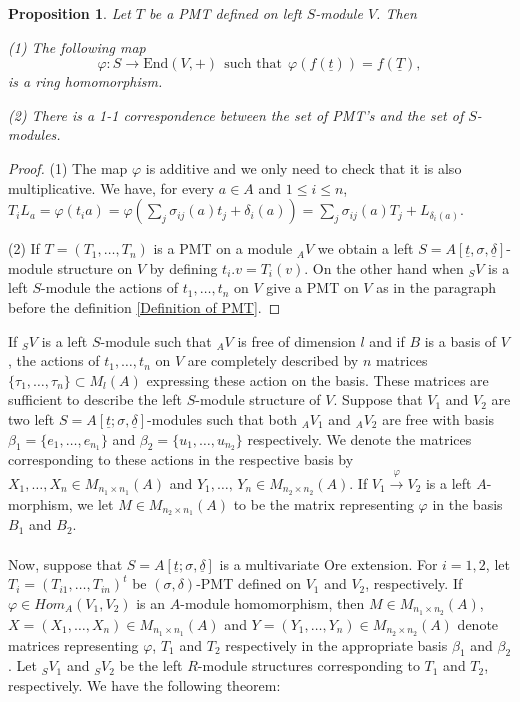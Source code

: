 \documentclass[12pt,a4paper]{article}
\newtheorem{proposition}[theorem]{Proposition}
\newcommand{\de}{\delta}
\newcommand{\si}{\sigma}
\newcommand{\ut}{\underline{t}}
\newcommand{\ud}{\underline{\delta}}
\begin{document}
	\begin{proposition} \label{Pro for varphi and 1 1 correspondence}
		Let $T$ be a PMT defined on left $S$-module $V$. Then
		\item (1) The following map
			$$
		\varphi: S \rightarrow \mathrm{End}(V,+)~~\text{such that}~~      \varphi(f(\ut))=f(\underline{T}), 
		$$
		is a ring homomorphism.
		
		\item (2)	There is a 1-1 correspondence between the set of PMT's and the set of $S$-modules.
	\end{proposition}
	\begin{proof}
		(1)  The map $\varphi$ is additive and we only need to check that it is also multiplicative.
		We have, for every $a\in A$ and $1\le i \le n$, $T_iL_a=\varphi(t_ia)=\varphi(\sum_j\sigma_
		{ij}(a)t_j+\delta_i(a))=\sum_{j}\sigma_{ij}(a)T_j +L_{\delta_i(a)}$.
		
		(2) If $T=(T_1,\dots,T_n)$ is a PMT on a module $_AV$ we obtain a left $S=A[\ut,\sigma,\ud]$-module structure on $V$ by defining $t_i.v=T_i(v)$.  On the other hand when $_SV$ is a left $S$-module the actions of $t_1,\dots,t_n$ on $V$ give a PMT on $V$ as in the paragraph before the definition \ref{Definition of PMT}.
	\end{proof}
	If $_SV$ is
	a left $S$-module such that $_AV$ is free of dimension $l$ and if $B$ is a basis of $V$, the actions of $t_1,\dots,t_n$ on $V$ are completely described by $n$ matrices $\{\tau_1,\dots,\tau_n\}\subset M_l(A)$ expressing these action on the basis. These matrices are sufficient to describe the left $S$-module structure  of $V$.  
	Suppose that $V_1$ and $V_2$ are two left $S=A[\ut;\sigma,\ud]$-modules such that both
	$_AV_1$ and $_AV_2$ are free with basis  
	$\beta_1=\{e_1,\dots,e_{n_1}\}$ and $\beta_2=\{u_1,\dots,u_{n_2}\}$ respectively.  We denote the matrices corresponding to these actions in the respective basis by $X_1,\dots,X_n\in M_{n_1\times n_1}(A)$ and $Y_1,\dots, \,Y_n \in M_{n_2\times n_2}(A)$. If $V_1\stackrel{\varphi}{\rightarrow} V_2 $ is a left $A$-morphism, we let $M\in M_{n_2 \times n_1}(A)$ to be the matrix representing $\varphi$ in the basis $B_1$ and $B_2$.
	\paragraph{}	
	Now, suppose that $S=A[\ut; \sigma, \ud]$  is a multivariate Ore extension.
	For $i=1,2$, let $T_i=(T_{i1},\dots,T_{in})^t$ be $(\si,\de)$-PMT defined on $V_1$ and $V_2$, respectively. If $\varphi \in Hom_A(V_1,V_2)$ is an $A$-module homomorphism, then  $M\in M_{n_1\times n_2}(A)$, $X=(X_1,\dots,X_n)\in M_{n_1\times n_1}(A)$ and $Y=(Y_1,\dots,Y_n) \in M_{n_2\times n_2}(A) $ denote 
	matrices representing $\varphi$, $T_1$ and $T_2$ 
	respectively in the appropriate basis $\beta_1$ and $\beta_2$.
	Let $_SV_1$ and $_SV_2$ be the left $R$-module structures corresponding to $T_1$ and $T_2$, 
	respectively. We have the following theorem:
\end{document}
